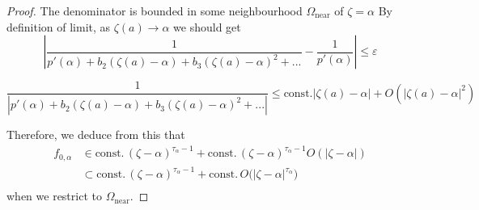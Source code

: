 \documentclass{article}
\theoremstyle{plain}
\newcommand{\volterra}{\mathcal{V}}
\newcommand{\hardpart}{\mathcal{V}_0}
\newcommand{\softpart}{\mathcal{V}_\star}
\newcommand{\domain}{\Omega}
\newenvironment{verify}{\color{ForestGreen}}{\color{black}}
\begin{document}
\begin{proof}
The denominator is bounded in some neighbourhood $\domain_{\text{near}}$ of $\zeta=\alpha$
\begin{verify}
By definition of limit, as $\zeta(a)\to\alpha$ we should get
\[
\left\vert\frac{1}{p'(\alpha)+b_2(\zeta(a)-\alpha)+b_3(\zeta(a)-\alpha)^2+...}-\frac{1}{p'(\alpha)}\right\vert\leq \varepsilon
\]
\end{verify}

\[
\frac{1}{|p'(\alpha)+b_2(\zeta(a)-\alpha)+b_3(\zeta(a)-\alpha)^2+...|}\leq  \text{const.} |\zeta(a)-\alpha| + O(|\zeta(a)-\alpha|^2)
\]

Therefore, we deduce from this that
\begin{align*}
f_{0,\alpha} & \in \text{const.}\,(\zeta-\alpha)^{\tau_\alpha-1} + \text{const.}\,(\zeta-\alpha)^{\tau_\alpha-1} O(|\zeta - \alpha|) \\
& \subset \text{const.}\,(\zeta-\alpha)^{\tau_\alpha-1} + \text{const.}\,O\big(|\zeta-\alpha|^{\tau_\alpha}\big) \\
\end{align*}
when we restrict to $\domain_\text{near}$.
\color{black}
\end{proof}





\end{document}
